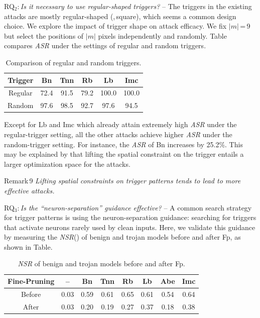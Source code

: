 \documentclass[compsoc,conference,a4paper,10pt,times]{IEEEtran}
\newcommand{\bn}{{\sc Bn}\xspace}
\newcommand{\tnn}{{\sc Tnn}\xspace}
\newcommand{\lb}{{\sc Lb}\xspace}
\newcommand{\rfb}{{\sc Rb}\xspace}
\newcommand{\abe}{{\sc Abe}\xspace}
\newcommand{\imc}{{\sc Imc}\xspace}
\newcommand{\asr}{{\em \small ASR}\xspace}
\newcommand{\nsr}{{\em \small NSR}\xspace}
\newcommand{\fp}{{\sc Fp}\xspace}
\begin{document}
\vspace{2pt}
{RQ$_2$:\,{\em Is it necessary to use regular-shaped triggers?}} -- The triggers in the existing attacks are mostly regular-shaped (\meg,\,square), which seems a common design choice. We explore the impact of trigger shape on attack efficacy. We fix $|m|$\,=\,9 but select the positions of $|m|$ pixels independently and randomly. Table compares \asr under the settings of regular and random triggers. 

\begin{table}[!ht]{\footnotesize
\centering
\renewcommand{\arraystretch}{1.2}
\begin{tabular}{c|c|c|c|c|c}
{Trigger} & \bn & \tnn & \rfb & \lb & \imc\\
\hline
\hline
Regular & 72.4 & 91.5 & 79.2 & 100.0 & 100.0 \\
Random & 97.6 & 98.5 & 92.7 & 97.6 & 94.5 \\
\end{tabular}
\caption{Comparison of regular and random triggers. \label{tab:scattered}}}
\end{table}

Except for \lb and \imc which already attain extremely high \asr under the regular-trigger setting, all the other attacks achieve higher \asr under the random-trigger setting. For instance, the \asr of \bn increases by 25.2\%. This may be explained by that lifting the spatial constraint on the trigger entails a larger optimization space for the attacks.
\begin{mtbox}{\small Remark\,9}
    {\em \small Lifting spatial constraints on trigger patterns tends to lead to more effective attacks.}
\end{mtbox}
    
\vspace{2pt}
{RQ$_3$:\,{\em Is the ``neuron-separation'' guidance effective?}} -- A common search strategy for trigger patterns is using the neuron-separation guidance: searching for triggers that activate neurons rarely used by clean inputs. Here, we validate this guidance by measuring the \nsr () of benign and trojan models before and after \fp, as shown in Table.

\begin{table}[!ht]{\footnotesize
    \centering
    \renewcommand{\arraystretch}{1.2}
\setlength{\tabcolsep}{3pt}
    \begin{tabular}{c|c|c|c|c|c|c|c}
           {Fine-Pruning}      & -- & \bn   & \tnn  & \rfb  & \lb   & \abe  & \imc  \\
        \hline
        \hline
        Before  & 0.03 & 0.59 & 0.61 & \cellcolor{Red}0.65 & 0.61 & 0.54 & 0.64 \\
        After & 0.03 & 0.20 & 0.19 & 0.27 & 0.37 & 0.18 & \cellcolor{Red}0.38 \\
    \end{tabular}
    \caption{\nsr of benign and trojan models before and after \fp. \label{tab:jac-index}}}
\end{table}
\end{document}
